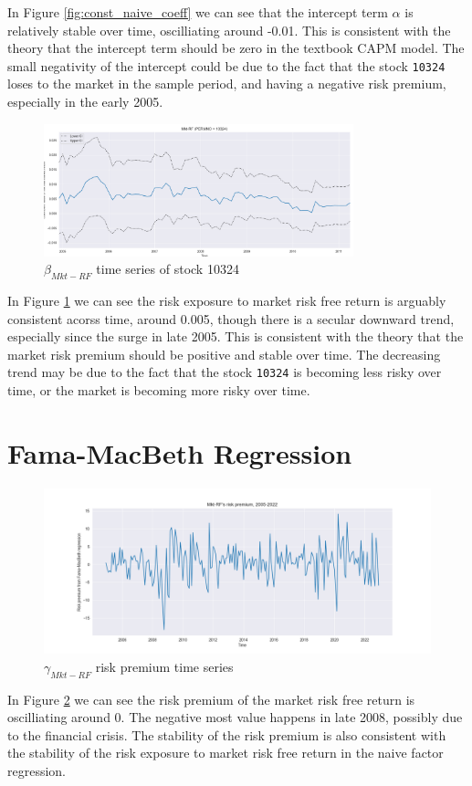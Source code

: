 \documentclass[10pt]{article} %
\begin{document}
In Figure \ref{fig:const_naive_coeff} we can see that the intercept term $\alpha$ is relatively stable over time, oscilliating around -0.01. This is consistent with the theory that the intercept term should be zero in the textbook CAPM model. The small negativity of the intercept could be due to the fact that the stock \texttt{10324} loses to the market in the sample period, and having a negative risk premium, especially in the early 2005.

\begin{figure}
    \centering
    \includegraphics[width=0.8\textwidth]{"../fig/mktrf_naive_coeff.png"}
    \caption{$\beta_{Mkt-RF}$ time series of stock 10324}
    \label{fig:mktrf_naive_coeff}
\end{figure}
In Figure \ref{fig:mktrf_naive_coeff} we can see the risk exposure to market risk free return is arguably consistent acorss time, around 0.005, though there is a secular downward trend, especially since the surge in late 2005. This is consistent with the theory that the market risk premium should be positive and stable over time. The decreasing trend may be due to the fact that the stock \texttt{10324} is becoming less risky over time, or the market is becoming more risky over time.

\section{Fama-MacBeth Regression}
\begin{figure}
    \centering
    \includegraphics[width=1\textwidth]{"../fig/mktrf_fm_riskp.png"}
    \caption{$\gamma_{Mkt-RF}$ risk premium time series}
    \label{fig:mktrf_fm_riskp}
\end{figure}
In Figure \ref{fig:mktrf_fm_riskp} we can see the risk premium of the market risk free return is oscilliating around 0. The negative most value happens in late 2008, possibly due to the financial crisis. The stability of the risk premium is also consistent with the stability of the risk exposure to market risk free return in the naive factor regression.
\end{document}
